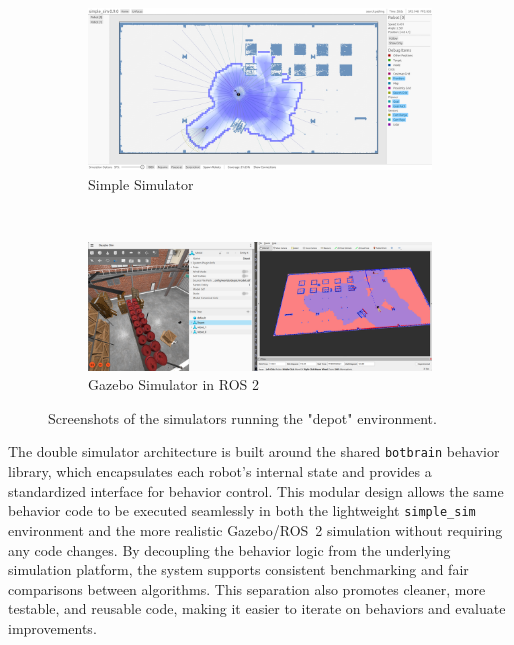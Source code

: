 \def\w{0.95\textwidth}
\begin{figure}[h]
    \centering
    \begin{subfigure}[b]{\w}
        \centering
        \includegraphics[width=\textwidth]{./figures/screenshots/simple_sim_depot.png}
        \caption{Simple Simulator}
        \label{fig:simple_sim}
    \end{subfigure} \\
    \vspace{3mm}
    \begin{subfigure}[b]{\w}
        \centering
        \includegraphics[width=\textwidth]{./figures/screenshots/gazebo_sim_depot.png}
        \caption{Gazebo Simulator in ROS 2}
        \label{fig:gazebo_sim}
    \end{subfigure}
    \caption{Screenshots of the simulators running the "depot" environment.}
    \label{fig:simulators}
\end{figure}

The double simulator architecture is built around the shared \texttt{botbrain} behavior library, which encapsulates each robot’s internal state and provides a standardized interface for behavior control. This modular design allows the same behavior code to be executed seamlessly in both the lightweight \texttt{simple\_sim} environment and the more realistic Gazebo/ROS~2 simulation without requiring any code changes. By decoupling the behavior logic from the underlying simulation platform, the system supports consistent benchmarking and fair comparisons between algorithms. This separation also promotes cleaner, more testable, and reusable code, making it easier to iterate on behaviors and evaluate improvements.
